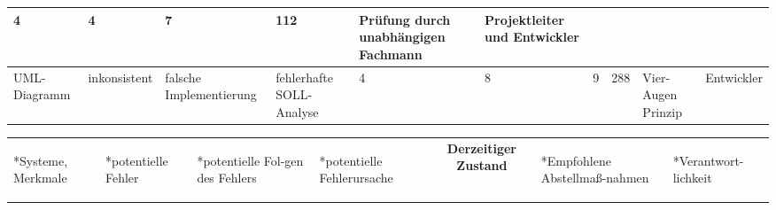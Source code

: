 \begin{center}
{\begin{tabular}{|p{1.5cm}|p{1.5cm}|p{1.7cm}|p{1.5cm}|p{0.25cm}|p{0.25cm}|p{0.25cm}|p{0.5cm}|p{1.5cm}|p{1.5cm}|}
{
	4
}&

{
	4
}&

{
	7
}&

{
	112
}&

{
	Pr\"{u}fung durch unabh\"{a}ngigen Fachmann
}&

{
	Projektleiter und Entwickler
}	\\ \hline
{
	UML-Diagramm
}&

{
	inkonsistent
}&

{
	falsche Implementierung
}&

{
	fehlerhafte SOLL-Analyse
}&

{
	4
}&

{
	8
}&

{
	9
}&

{
	288
}&

{
	Vier-Augen Prinzip
}&

{
	Entwickler
}	\\ \hline
%
%
\end{tabular}} \newpage
		{
			\tiny
				\begin{tabular}{|p{1.5cm}|p{1.5cm}|p{1.7cm}|p{1.5cm}|p{0.25cm}|p{0.25cm}|p{0.25cm}|p{0.5cm}|p{1.5cm}|p{1.5cm}|} \hline

					\begin{center}\multirow{2}*{\parbox{5cm}{Systeme, \newline Merkmale}}\end{center}	&
					\begin{center}\multirow{2}*{\parbox{5cm}{potentielle \newline Fehler}}\end{center}	&
					\begin{center}\multirow{2}*{\parbox{5cm}{potentielle Fol-\newline gen des Fehlers}}\end{center}	&
					\begin{center}\multirow{2}*{\parbox{5cm}{potentielle \newline Fehlerursache}}\end{center}	&
					\multicolumn{4}{c|}{\textbf{Derzeitiger Zustand}}	&
					\begin{center}\multirow{2}*{\parbox{5cm}{Empfohlene \newline Abstellma\ss{}-\newline nahmen}}\end{center}	&
					\begin{center}\multirow{2}*{\parbox{5cm}{Verantwort- \newline lichkeit}}\end{center}	\\ \cline{5-8}
					

\end{tabular}}
\end{center}
